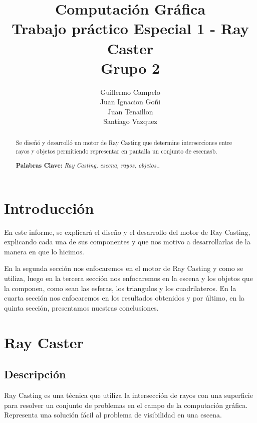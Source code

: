 \documentclass[a4paper,10pt]{article}
\begin{document}
\title{{Computaci\'on Gr\'afica \\ Trabajo pr\'actico Especial 1 - Ray Caster\\ Grupo 2}}
\author{Guillermo Campelo\\Juan Ignacion Go\~ni\\Juan Tenaillon\\Santiago Vazquez}
\date{}


\maketitle

\begin{abstract}

Se dise\~n\'o y desarroll\'o un motor de Ray Casting que determine intersecciones entre rayos y objetos permitiendo representar en pantalla un conjunto de escenasb.

\textbf{Palabras Clave: }\emph{Ray Casting, escena, rayos, objetos.}.
\end{abstract}



\section{Introducci\'on}
\label{introduccion}

En este informe, se explicar\'a el dise\~no y el desarrollo del motor de Ray Casting, explicando cada una de sus componentes y que nos motivo a desarrollarlas de la manera en que lo hicimos.

En la segunda secci\'on nos enfocaremos en el motor de Ray Casting y como se utiliza, luego en la tercera secci\'on nos enfocaremos en la escena y los objetos que la componen, como sean las esferas, 
los triangulos y los cuadrilateros.  En la cuarta secci\'on nos enfocaremos en los resultados obtenidos y por \'ultimo, en la quinta secci\'on, presentamos nuestras conclusiones.
\section{Ray Caster}
\label{raycaster}

\subsection{Descripci\'on}
\label{subseccion}
Ray Casting es una t\'ecnica que utiliza la intersecci\'on de rayos con una superficie para resolver un conjunto de problemas en el campo de la computaci\'on gr\'afica.  Representa una soluci\'on f\'acil al problema de visibilidad en una escena.
\end{document}
